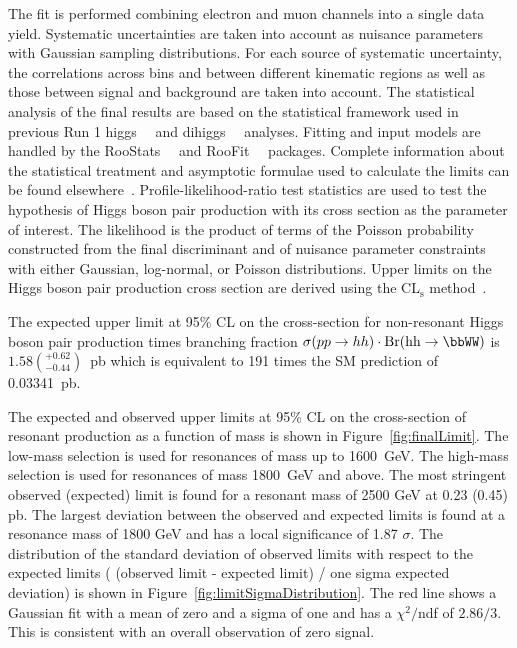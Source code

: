 The fit is performed combining electron and muon channels into a single data yield. Systematic uncertainties are taken into account as nuisance parameters with Gaussian sampling distributions. For each source of systematic uncertainty, the correlations across bins and between different kinematic regions as well as those between signal and background are taken into account. The statistical analysis of the final results are based on the statistical framework used in previous Run 1 higgs~~\cite{Aad:2012an} and dihiggs~~\cite{Aad:2052848} analyses. Fitting and input models are handled by the RooStats~~\cite{2010acat.confE..57M} and RooFit~~\cite{2003physics...6116V} packages. Complete information about the statistical treatment and asymptotic formulae used to calculate the limits can be found elsewhere~\cite{Cowan:2010js}. Profile-likelihood-ratio test statistics are used to 
test the hypothesis of Higgs boson pair production with its cross section as the parameter of interest. The likelihood is the product of terms of the Poisson probability constructed from the final discriminant and of nuisance parameter constraints with either Gaussian, log-normal, or Poisson distributions. Upper limits on the Higgs boson pair production cross section are derived using the CL$_\text{s}$ method~\cite{0954-3899-28-10-313}.

The expected upper limit at 95\% CL on the cross-section for non-resonant Higgs boson pair production times branching fraction $\sigma(pp \to hh) \cdot {\rm Br(hh}\to\rm{ \bbWW})$ is $1.58\left(^{+0.62}_{-0.44}\right)$~pb  which is equivalent to 191 times the SM prediction of 0.03341~pb.

The expected and observed upper limits at 95\% CL on the cross-section of resonant production as a function of mass is shown in Figure~\ref{fig:finalLimit}. The low-mass selection is used for resonances of mass up to 1600~GeV. The high-mass selection is used for resonances of mass 1800~GeV and above. The most stringent observed (expected) limit is found for a resonant mass of 2500 GeV at 0.23 (0.45) pb. The largest deviation between the observed and expected limits is found at a resonance mass of 1800 GeV and has a local significance of 1.87 $\sigma$. The distribution of the standard deviation of observed limits with respect to the expected limits ( (observed limit - expected limit) / one sigma expected deviation) is shown in Figure~\ref{fig:limitSigmaDistribution}. The red line shows a Gaussian fit with a mean of zero and a sigma of one and has a $\chi^2/$ndf of $2.86/3$. This is consistent with an overall observation of zero signal.

